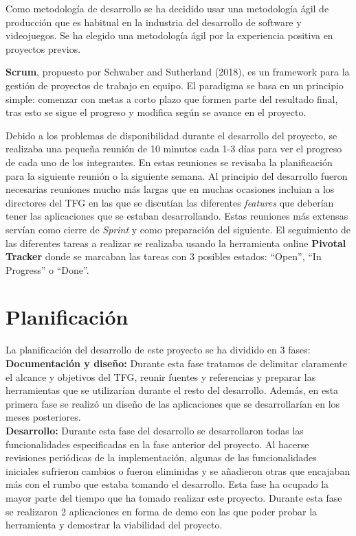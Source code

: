 Como metodolog\'ia de desarrollo se ha decidido usar una metodolog\'ia \'agil de producci\'on que es habitual en la industria del desarrollo de software y videojuegos. Se ha elegido una metodolog\'ia \'agil por la experiencia positiva en proyectos previos.

\textbf{Scrum}, propuesto por Schwaber and Sutherland (2018), es un framework para la gesti\'on de proyectos de trabajo en equipo. El paradigma se basa en un principio simple: comenzar con metas a corto plazo que formen parte del resultado final, tras esto se sigue el progreso y modifica seg\'un se avance en el proyecto.

Debido a los problemas de disponibilidad durante el desarrollo del proyecto, se realizaba una peque\~na reuni\'on de 10 minutos cada 1-3 d\'ias para ver el progreso de cada uno de los integrantes. En estas reuniones se revisaba la planificaci\'on para la siguiente reuni\'on o la siguiente semana. Al principio del desarrollo fueron necesarias reuniones mucho m\'as largas que en muchas ocasiones incluian a los directores del TFG en las que se discut\'ian las diferentes \textit{features} que deber\'ian tener las aplicaciones que se estaban desarrollando. Estas reuniones m\'as extensas serv\'ian como cierre de \textit{Sprint} y como preparaci\'on del siguiente. El seguimiento de las diferentes tareas a realizar se realizaba usando la herramienta online \textbf{Pivotal Tracker} donde se marcaban las tareas con 3 posibles estados: ``Open'', ``In Progress'' o ``Done''.


\section{Planificaci\'on}

La planificaci\'on del desarrollo de este proyecto se ha dividido en 3 fases:\\


\textbf{Documentaci\'on y dise\~no:} Durante esta fase tratamos de delimitar claramente el alcance y objetivos del TFG, reunir fuentes y referencias y preparar las herramientas que se utilizar\'ian durante el resto del desarrollo. Adem\'as, en esta primera fase se realiz\'o un dise\~no de las aplicaciones que se desarrollar\'ian en los meses posteriores.\\

\textbf{Desarrollo:} Durante esta fase del desarrollo se desarrollaron todas las funcionalidades especificadas en la fase anterior del proyecto. Al hacerse revisiones peri\'odicas de la implementaci\'on, algunas de las funcionalidades iniciales sufrieron cambios o fueron eliminidas y se a\~nadieron otras que encajaban m\'as con el rumbo que estaba tomando el desarrollo. 
Esta fase ha ocupado la mayor parte del tiempo que ha tomado realizar este proyecto. Durante esta fase se realizaron 2 aplicaciones en forma de demo con las que poder probar la herramienta y demostrar la viabilidad del proyecto.\\

